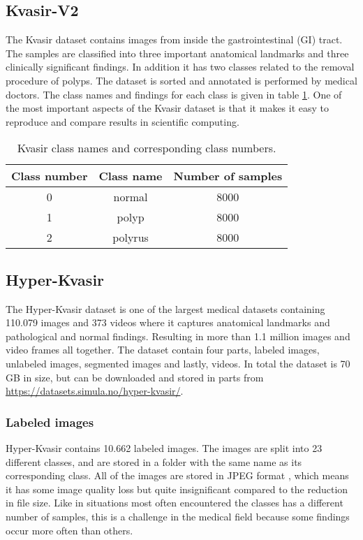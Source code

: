 \documentclass[thesis.tex]{subfiles}
\begin{document}
\subsection{Kvasir-V2} \label{sec:kvasir-v2}
The Kvasir dataset \cite{KVASIRMultiClass17} contains images from inside the gastrointestinal (GI) tract. The samples are classified into three important anatomical landmarks and three clinically significant findings. In addition it has two classes related to the removal procedure of polyps. The dataset is sorted and annotated is performed by medical doctors. The class names and findings for each class is given in table \ref{table:kvasir}. One of the most important aspects of the Kvasir dataset is that it makes it easy to reproduce and compare results in scientific computing.

\begin{table}
  \centering
  \begin{tabular}{ |c|c|c| }
  	\hline
  	Class number & Class name & Number of samples \\
    \hline
    0 & normal & 8000 \\ 
    1 & polyp & 8000 \\ 
    2 & polyrus & 8000 \\ 
    \hline
  \end{tabular}
  \caption{Kvasir class names and corresponding class numbers.}
  \label{table:kvasir}
\end{table}


\subsection{Hyper-Kvasir} \label{sec:hyper_kvasir}
The Hyper-Kvasir dataset \cite{HyperKvasirComprehensive19} is one of the largest medical datasets containing 110.079 images and 373 videos where it captures anatomical landmarks and pathological and normal findings. Resulting in more than 1.1 million images and video frames all together. The dataset contain four parts, labeled images, unlabeled images, segmented images and lastly, videos. In total the dataset is 70 GB in size, but can be downloaded and stored in parts from \url{https://datasets.simula.no/hyper-kvasir/}.


\subsubsection{Labeled images}
Hyper-Kvasir contains 10.662 labeled images. The images are split into 23 different classes, and are stored in a folder with the same name as its corresponding class. All of the images are stored in JPEG format \cite{JPEGStill92}, which means it has some image quality loss but quite insignificant compared to the reduction in file size. Like in situations most often encountered the classes has a different number of samples, this is a challenge in the medical field because some findings occur more often than others.
\end{document}
